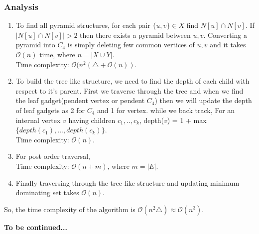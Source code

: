 \documentclass[11pt]{article}
\begin{document}
%
%
\subsubsection{Analysis}
\begin{enumerate}
\item To find all pyramid structures, for each pair $\{ u,v \} \in X$ find $N[u] \cap N[v]$. If $|N[u] \cap N[v]| > 2$ then there exists a pyramid between $u,v$. Converting a pyramid into $C_4$ is simply deleting few common vertices of $u,v$ and it takes $\mathcal{O}(n)$ time, where $n = |X \cup Y|$.\\
Time complexity: $\mathcal{O}(n^2 (\triangle +\mathcal{O}(n))$.

\item To build the tree like structure, we need to find the depth of each child with respect to it's parent. First we traverse through the tree and when we find the leaf gadget(pendent vertex or pendent $C_4$) then we will update the depth of leaf gadgets as 2 for $C_4$ and 1 for vertex. while we back track, For an internal vertex $v$ having children $c_1,..,c_k$, depth($v$) = 1 + max$\{depth(c_1),...,depth(c_k)\}$. \\ Time complexity: $\mathcal{O}(n)$.

\item For post order traversal, \\
Time complexity: $\mathcal{O}(n + m)$, where $m = |E|$.

\item Finally traversing through the tree like structure and updating minimum dominating set takes $\mathcal{O}(n)$.
\end{enumerate}
So, the time complexity of the algorithm is $\mathcal{O}(n^2 \triangle) \approx \mathcal{O}(n^3)$.

\bigskip
\textbf{To be continued...}
\end{document}
